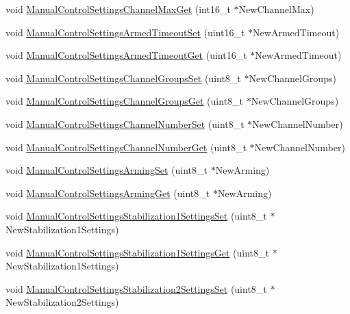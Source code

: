 \begin{DoxyCompactItemize}
void \hyperlink{group___manual_control_settings_gaf825551f42e7a2474fdc9ae448320b00}{\-Manual\-Control\-Settings\-Channel\-Max\-Get} (int16\-\_\-t $\ast$\-New\-Channel\-Max)
\item 
void \hyperlink{group___manual_control_settings_ga2a1b601612b1801ad00f0310c3c200af}{\-Manual\-Control\-Settings\-Armed\-Timeout\-Set} (uint16\-\_\-t $\ast$\-New\-Armed\-Timeout)
\item 
void \hyperlink{group___manual_control_settings_ga0f8ba37efb1acd80c644104b42a4aae4}{\-Manual\-Control\-Settings\-Armed\-Timeout\-Get} (uint16\-\_\-t $\ast$\-New\-Armed\-Timeout)
\item 
void \hyperlink{group___manual_control_settings_ga8866ce2d0c201eda6513cf1c403a31a1}{\-Manual\-Control\-Settings\-Channel\-Groups\-Set} (uint8\-\_\-t $\ast$\-New\-Channel\-Groups)
\item 
void \hyperlink{group___manual_control_settings_gaf6bcde9ff3b13ad2f4e93aaaa1b5ed5b}{\-Manual\-Control\-Settings\-Channel\-Groups\-Get} (uint8\-\_\-t $\ast$\-New\-Channel\-Groups)
\item 
void \hyperlink{group___manual_control_settings_gafafa6390c33bfd24cf98e82078f04790}{\-Manual\-Control\-Settings\-Channel\-Number\-Set} (uint8\-\_\-t $\ast$\-New\-Channel\-Number)
\item 
void \hyperlink{group___manual_control_settings_gaf9d37e54e2b7ffafe620c17827edfb8d}{\-Manual\-Control\-Settings\-Channel\-Number\-Get} (uint8\-\_\-t $\ast$\-New\-Channel\-Number)
\item 
void \hyperlink{group___manual_control_settings_ga077eac4e394609d9123e2d198f9c1b99}{\-Manual\-Control\-Settings\-Arming\-Set} (uint8\-\_\-t $\ast$\-New\-Arming)
\item 
void \hyperlink{group___manual_control_settings_ga0a039859f9f380647f54271444aca4f5}{\-Manual\-Control\-Settings\-Arming\-Get} (uint8\-\_\-t $\ast$\-New\-Arming)
\item 
void \hyperlink{group___manual_control_settings_ga1af6952b2ee4eb81d090e5ab3bbb237c}{\-Manual\-Control\-Settings\-Stabilization1\-Settings\-Set} (uint8\-\_\-t $\ast$\-New\-Stabilization1\-Settings)
\item 
void \hyperlink{group___manual_control_settings_ga463def31afe5abb2ed65a21d15e0388a}{\-Manual\-Control\-Settings\-Stabilization1\-Settings\-Get} (uint8\-\_\-t $\ast$\-New\-Stabilization1\-Settings)
\item 
void \hyperlink{group___manual_control_settings_ga7eadca7c9fa02cacf5da70903aa2ed43}{\-Manual\-Control\-Settings\-Stabilization2\-Settings\-Set} (uint8\-\_\-t $\ast$\-New\-Stabilization2\-Settings)

\end{DoxyCompactItemize}
